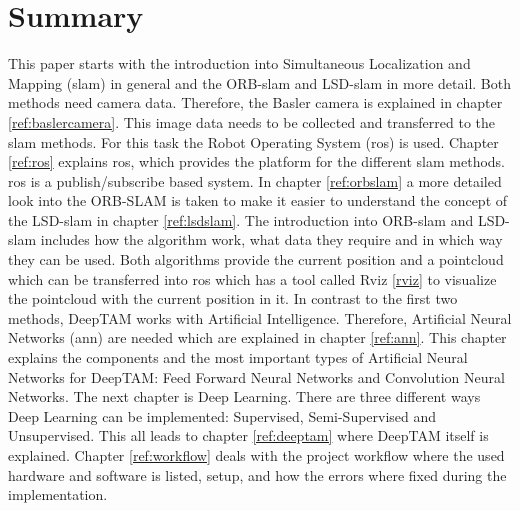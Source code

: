 

\chapter*{Summary}

This paper starts with the introduction into Simultaneous Localization and Mapping (\gls{slam}) in general and the ORB-\gls{slam} and LSD-\gls{slam} in more detail. \newline
Both methods need camera data. Therefore, the Basler camera is explained in chapter \ref{ref:baslercamera}. This image data needs to be collected and transferred to the \gls{slam} methods. For this task the Robot Operating System (\gls{ros}) is used. Chapter \ref{ref:ros} explains \gls{ros}, which provides the platform for the different \gls{slam} methods. \gls{ros} is a publish/subscribe based system. In chapter \ref{ref:orbslam} a more detailed look into the ORB-SLAM is taken to make it easier to understand the concept of the LSD-\gls{slam} in chapter \ref{ref:lsdslam}. The introduction into ORB-\gls{slam} and LSD-\gls{slam} includes how the algorithm work, what data they require and in which way they can be used. Both algorithms provide the current position and a pointcloud which can be transferred into \gls{ros} which has a tool called Rviz \ref{rviz} to visualize the pointcloud with the current position in it. \newline
In contrast to the first two methods, DeepTAM works with Artificial Intelligence. Therefore, Artificial Neural Networks (\gls{ann}) are needed which are explained in chapter \ref{ref:ann}. This chapter explains the components and the most important types of Artificial Neural Networks for DeepTAM: Feed Forward Neural Networks and Convolution Neural Networks. The next chapter is Deep Learning. There are three different ways Deep Learning can be implemented: Supervised, Semi-Supervised and Unsupervised. This all leads to chapter \ref{ref:deeptam} where DeepTAM itself is explained. \newline
Chapter \ref{ref:workflow} deals with the project workflow where the used hardware and software is listed, setup, and how the errors where fixed during the implementation.
